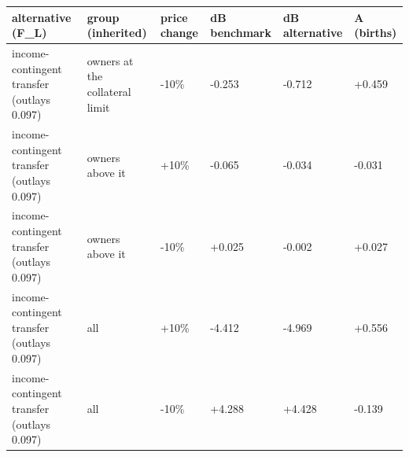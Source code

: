 \begingroup\small
\setlength{\tabcolsep}{3pt}
\renewcommand{\arraystretch}{1.04}
\begin{tabularx}{\linewidth}{XXXXXX}
\toprule
alternative (F\_L) & group (inherited) & price change & dB benchmark & dB alternative & A (births) \\
\midrule
income-contingent transfer (outlays 0.097) & owners at the collateral limit & -10\% & -0.253 & -0.712 & +0.459 \\
income-contingent transfer (outlays 0.097) & owners above it & +10\% & -0.065 & -0.034 & -0.031 \\
income-contingent transfer (outlays 0.097) & owners above it & -10\% & +0.025 & -0.002 & +0.027 \\
income-contingent transfer (outlays 0.097) & all & +10\% & -4.412 & -4.969 & +0.556 \\
income-contingent transfer (outlays 0.097) & all & -10\% & +4.288 & +4.428 & -0.139 \\
\bottomrule
\end{tabularx}
\endgroup

